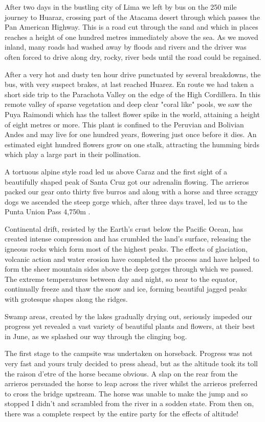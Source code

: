 \documentclass[a5paper,openany,font 10pt]{scrbook}
\begin{document}
After two days in the bustling city of Lima we left by bus
on the 250 mile journey to Huaraz, crossing part of the Atacama
desert through which passes the Pan American Highway. This is a
road cut through the sand and which in places reaches a height of
one hundred metres immediately above the sea. As we moved inland,
many roads had washed away by floods and rivers and the driver
was often forced to drive along dry, rocky, river beds until the
road could be regained.

After a very hot and dusty ten hour drive punctuated by
several breakdowns, the bus, with very suspect brakes, at last
reached Huarez. En route we had taken a short side trip to the
Parachota Valley on the edge of the High Cordillera. In this
remote valley of sparse vegetation and deep clear "coral like"
pools, we saw the Puya Raimondi which has the tallest flower
spike in the world, attaining a height of eight metres or more.
This plant is confined to the Peruvian and Bolivian Andes and may
live for one hundred years, flowering just once before it dies.
An estimated eight hundred flowers grow on one stalk, attracting
the humming birds which play a large part in their pollination.

A tortuous alpine style road led us above Caraz and the
first sight of a beautifully shaped peak of Santa Cruz got our
adrenalin flowing. The arrieros packed our gear onto thirty five
burros and along with a horse and three scraggy dogs we ascended
the steep gorge which, after three days travel, led us to the
Punta Union Pass  4,750m .

Continental drift, resisted by the Earth's crust below the
Pacific Ocean, has created intense compression and has crumbled
the land's surface, releasing the igneous rocks which form most
of the highest peaks. The effects of glaciation, volcanic action
and water erosion have completed the process and have helped to
form the sheer mountain sides above the deep gorges through which
we passed. The extreme temperatures between day and night, so
near to the equator, continually freeze and thaw the snow and
ice, forming beautiful jagged peaks with grotesque shapes along
the ridges.

Swamp areas, created by the lakes gradually drying out,
seriously impeded our progress yet revealed a vast variety of
beautiful plants and flowers, at their best in June, as we
splashed our way through the clinging bog.

The first stage to the campsite was undertaken on horseback.
Progress was not very fast and yours truly decided to press
ahead, but as the altitude took its toll the raison d'etre of the
horse became obvious. A slap on the rear from the arrieros
persuaded the horse to leap across the river whilst the arrieros
preferred to cross the bridge upstream. The horse was unable to
make the jump and so stopped  I didn't   and scrambled from the
river in a sodden state. From then on, there was a complete
respect by the entire party for the effects of altitude!
\end{document}
